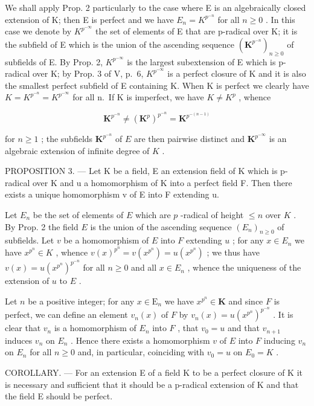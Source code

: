 We shall apply Prop. 2 particularly to the case where E is an algebraically closed extension of K; then E is perfect and we have \(E_{n} = K^{p^{-n}}\) for all \(n \geqslant 0\) . In this case we denote by \(K^{p^{-\infty}}\) the set of elements of E that are p-radical over K; it is the subfield of E which is the union of the ascending sequence \((\mathbf{K}^{p^{-n}})_{n \geqslant 0}\) of subfields of E. By Prop. 2, \(K^{p^{-\infty}}\) is the largest subextension of E which is p-radical over K; by Prop. 3 of V, p.~6, \(K^{p^{-\infty}}\) is a perfect closure of K and it is also the smallest perfect subfield of E containing K. When K is perfect we clearly have \(K = K^{p^{-n}} = K^{p^{-\infty}}\) for all n.~If K is imperfect, we have \(K \neq K^{p}\) , whence

\[
\mathbf {K} ^ {p ^ {- n}} \neq (\mathbf {K} ^ {p}) ^ {p ^ {- n}} = \mathbf {K} ^ {p ^ {- (n - 1)}}
\]

for \(n \geqslant 1\) ; the subfields \(\mathbf{K}^{p^{-n}}\) of \(E\) are then pairwise distinct and \(\mathbf{K}^{p^{-\infty}}\) is an algebraic extension of infinite degree of \(K\) .

PROPOSITION 3. --- Let K be a field, E an extension field of K which is p-radical over K and u a homomorphism of K into a perfect field F. Then there exists a unique homomorphism v of E into F extending u.

Let \(E_n\) be the set of elements of \(E\) which are \(p\) -radical of height \(\leqslant n\) over \(K\) . By Prop. 2 the field \(E\) is the union of the ascending sequence \((E_n)_{n \geqslant 0}\) of subfields. Let \(v\) be a homomorphism of \(E\) into \(F\) extending \(u\) ; for any \(x \in E_n\) we have \(x^{p^n} \in K\) , whence \(v(x)^{p^n} = v(x^{p^n}) = u(x^{p^n})\) ; we thus have \(v(x) = u(x^{p^n})^{p^{-n}}\) for all \(n \geqslant 0\) and all \(x \in E_n\) , whence the uniqueness of the extension of \(u\) to \(E\) .

Let \(n\) be a positive integer; for any \(x \in \mathrm{E}_n\) we have \(x^{p^n} \in \mathbf{K}\) and since \(F\) is perfect, we can define an element \(v_n(x)\) of \(F\) by \(v_n(x) = u(x^{p^n})^{p^{-n}}\) . It is clear that \(v_n\) is a homomorphism of \(E_n\) into \(F\) , that \(v_0 = u\) and that \(v_{n+1}\) induces \(v_n\) on \(E_n\) . Hence there exists a homomorphism \(v\) of \(E\) into \(F\) inducing \(v_n\) on \(E_n\) for all \(n \geqslant 0\) and, in particular, coinciding with \(v_0 = u\) on \(E_0 = K\) .

COROLLARY. --- For an extension E of a field K to be a perfect closure of K it is necessary and sufficient that it should be a p-radical extension of K and that the field E should be perfect.

